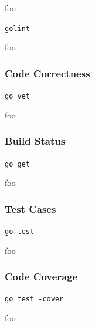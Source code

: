 

foo

\texttt{golint}

%

\cite{golint}

foo

\subsubsection{Code Correctness}

\texttt{go vet}

foo

\subsubsection{Build Status}

\texttt{go get}

foo

\subsubsection{Test Cases}

\texttt{go test}

foo

\subsubsection{Code Coverage}

\texttt{go test -cover}

foo
